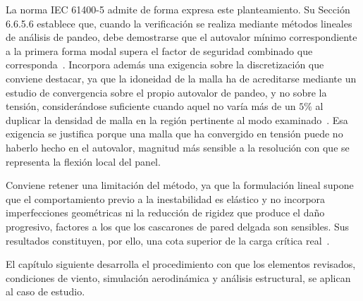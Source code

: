 La norma IEC 61400-5 admite de forma expresa este planteamiento. Su Sección 6.6.5.6 establece que, cuando la verificación se realiza mediante métodos lineales de análisis de pandeo, debe demostrarse que el autovalor mínimo correspondiente a la primera forma modal supera el factor de seguridad combinado que corresponda~\parencite{IEC61400-5}. Incorpora además una exigencia sobre la discretización que conviene destacar, ya que la idoneidad de la malla ha de acreditarse mediante un estudio de convergencia sobre el propio autovalor de pandeo, y no sobre la tensión, considerándose suficiente cuando aquel no varía más de un $5\%$ al duplicar la densidad de malla en la región pertinente al modo examinado~\parencite{IEC61400-5}. Esa exigencia se justifica porque una malla que ha convergido en tensión puede no haberlo hecho en el autovalor, magnitud más sensible a la resolución con que se representa la flexión local del panel.

Conviene retener una limitación del método, ya que la formulación lineal supone que el comportamiento previo a la inestabilidad es elástico y no incorpora imperfecciones geométricas ni la reducción de rigidez que produce el daño progresivo, factores a los que los cascarones de pared delgada son sensibles. Sus resultados constituyen, por ello, una cota superior de la carga crítica real~\parencite{Timoshenko1961}.

El capítulo siguiente desarrolla el procedimiento con que los elementos revisados, condiciones de viento, simulación aerodinámica y análisis estructural, se aplican al caso de estudio.
